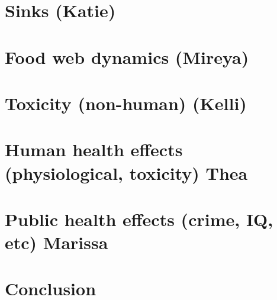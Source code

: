 \documentclass{article}\usepackage[]{graphicx}\usepackage[]{color}
\begin{document}
\section{Sinks (Katie)}\section{Food web dynamics (Mireya)}

\section{Toxicity (non-human) (Kelli)}

\section{Human health effects (physiological, toxicity) Thea}

\section{Public health effects (crime, IQ, etc) Marissa}


\section{Conclusion}
\end{document}
